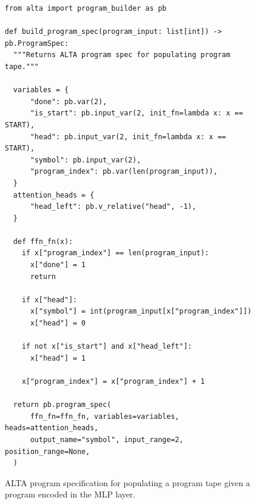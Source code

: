 \begin{figure}[h!]
\centering
\begin{verbatim}
from alta import program_builder as pb

def build_program_spec(program_input: list[int]) -> pb.ProgramSpec:
  """Returns ALTA program spec for populating program tape."""

  variables = {
      "done": pb.var(2),
      "is_start": pb.input_var(2, init_fn=lambda x: x == START),
      "head": pb.input_var(2, init_fn=lambda x: x == START),
      "symbol": pb.input_var(2),
      "program_index": pb.var(len(program_input)),
  }
  attention_heads = {
      "head_left": pb.v_relative("head", -1),
  }

  def ffn_fn(x):
    if x["program_index"] == len(program_input):
      x["done"] = 1
      return

    if x["head"]:
      x["symbol"] = int(program_input[x["program_index"]])
      x["head"] = 0

    if not x["is_start"] and x["head_left"]:
      x["head"] = 1

    x["program_index"] = x["program_index"] + 1

  return pb.program_spec(
      ffn_fn=ffn_fn, variables=variables, heads=attention_heads,
      output_name="symbol", input_range=2, position_range=None,
  )
\end{verbatim}
\caption{ALTA program specification for populating a program tape given a program encoded in the MLP layer.}
\label{fig:populate_program}
\end{figure}
